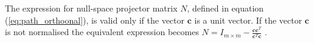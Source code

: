 
\begin{remark}
    The expression for null-space projector matrix $N$, defined in equation (\ref{eq:path_orthoonal}), is valid only if the vector $\bm{c}$ is a unit vector. If the vector $\bm{c}$ is not normalised the equivalent expression becomes $N = I_{m\times m} - \frac{\bm{c}\bm{c}^T}{\bm{c}^T\bm{c}}$ \cite[p. 431]{meyer2001Matrix}.
\end{remark}


